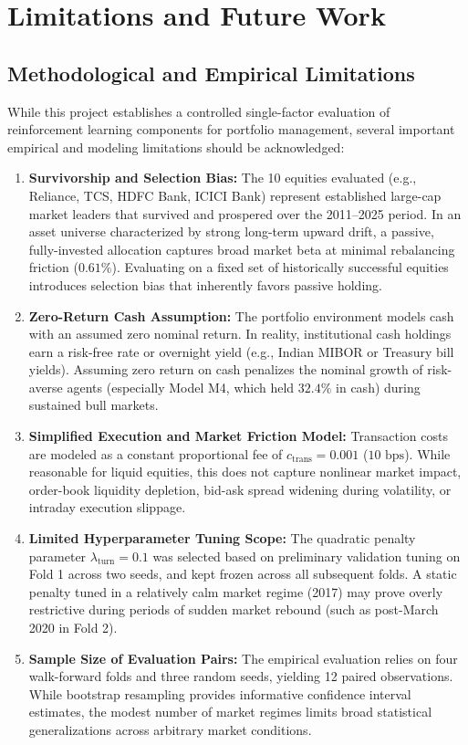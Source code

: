 \chapter{Limitations and Future Work}
\label{ch:limitations}

\section{Methodological and Empirical Limitations}
While this project establishes a controlled single-factor evaluation of reinforcement learning components for portfolio management, several important empirical and modeling limitations should be acknowledged:

\begin{enumerate}
    \item \textbf{Survivorship and Selection Bias:} The 10 equities evaluated (e.g., Reliance, TCS, HDFC Bank, ICICI Bank) represent established large-cap market leaders that survived and prospered over the 2011--2025 period. In an asset universe characterized by strong long-term upward drift, a passive, fully-invested allocation captures broad market beta at minimal rebalancing friction ($0.61\%$). Evaluating on a fixed set of historically successful equities introduces selection bias that inherently favors passive holding.
    \item \textbf{Zero-Return Cash Assumption:} The portfolio environment models cash with an assumed zero nominal return. In reality, institutional cash holdings earn a risk-free rate or overnight yield (e.g., Indian MIBOR or Treasury bill yields). Assuming zero return on cash penalizes the nominal growth of risk-averse agents (especially Model M4, which held $32.4\%$ in cash) during sustained bull markets.
    \item \textbf{Simplified Execution and Market Friction Model:} Transaction costs are modeled as a constant proportional fee of $c_{\text{trans}} = 0.001$ ($10\text{ bps}$). While reasonable for liquid equities, this does not capture nonlinear market impact, order-book liquidity depletion, bid-ask spread widening during volatility, or intraday execution slippage.
    \item \textbf{Limited Hyperparameter Tuning Scope:} The quadratic penalty parameter $\lambda_{\text{turn}} = 0.1$ was selected based on preliminary validation tuning on Fold 1 across two seeds, and kept frozen across all subsequent folds. A static penalty tuned in a relatively calm market regime (2017) may prove overly restrictive during periods of sudden market rebound (such as post-March 2020 in Fold 2).
    \item \textbf{Sample Size of Evaluation Pairs:} The empirical evaluation relies on four walk-forward folds and three random seeds, yielding 12 paired observations. While bootstrap resampling provides informative confidence interval estimates, the modest number of market regimes limits broad statistical generalizations across arbitrary market conditions.
\end{enumerate}


